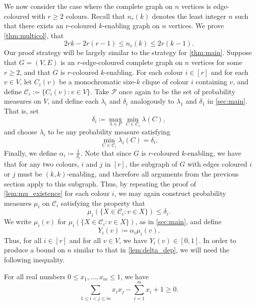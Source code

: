 \documentclass[12pt,a4paper]{article}
\begin{document}
We now consider the case where the complete graph on $n$ vertices is edge-coloured with $r \geq 2$ colours. Recall that $n_r(k)$ denotes the least integer $n$ such that there exists an $r$-coloured $k$-enabling graph on $n$ vertices. We prove \cref{thm:multicol}, that 
\begin{equation*}
     2rk - 2r(r-1) \leq n_r(k) \leq 2r(k - 1).
\end{equation*} 
Our proof strategy will be largely similar to the strategy for \cref{thm:main}. Suppose that $G = (V,E)$ is an $r$-edge-coloured complete graph on $n$ vertices for some $r \geq 2$, and that $G$ is $r$-coloured $k$-enabling. For each colour $i \in [r]$ and for each $v \in V$, let $C_i(v)$ be a monochromatic size-$k$ clique of colour $i$ containing $v$, and define $\mathcal{C}_i := \{C_i(v): v \in V\}$. Take $\mathcal{P}$ once again to be the set of probability measures on $V$, and define each $\lambda_i$ and $\delta_i$ analogously to $\lambda_1$ and $\delta_1$ in \cref{sec:main}. That is, set 
\[\delta_i \coloneq \max_{\lambda \in P} \min_{C \in \mathcal{C}_i} \lambda(C),\] 
and choose $\lambda_i$ to be any probability measure satisfying 
\[\min_{C \in \mathcal{C}_i}\lambda_i(C) = \delta_i.\] 
Finally, we define $\alpha_i \coloneq \frac{1}{\delta_i}$. Note that since $G$ is $r$-coloured $k$-enabling, we have that for any two colours, $i$ and $j$ in $[r]$, the subgraph of $G$ with edges coloured $i$ or $j$ must be $(k,k)$-enabling, and therefore all arguments from the previous section apply to this subgraph. Thus, by repeating the proof of \cref{lem:mu_existence} for each colour $i$, we may again construct probability measures $\mu_i$ on $\mathcal{C}_i$ satisfying the property that 
\begin{equation*}
    \mu_i(\{X \in \mathcal{C}_i: v \in X\}) \leq \delta_i.
\end{equation*}
We write $\mu_i(v)$ for $\mu_i(\{X \in \mathcal{C}_i: v \in X\})$, as in \cref{sec:main}, and define 
\begin{equation*}
    Y_i(v) \coloneq \alpha_i \mu_i(v).
\end{equation*}
Thus, for all $i \in [r]$ and for all $v \in V$, we have $Y_i(v) \in [0, 1]$. In order to produce a bound on $n$ similar to that in \cref{lem:delta_dep}, we will need the following inequality.
\begin{lemma} \label{lem:improved}
    For all real numbers $0 \leq x_1, \dots, x_m \leq 1$, we have 
    \begin{equation*}
        \sum_{1 \leq i < j \leq m} x_i x_j - \sum_{i=1}^{m} x_i + 1 \geq 0.
    \end{equation*}
\end{lemma}
\end{document}
